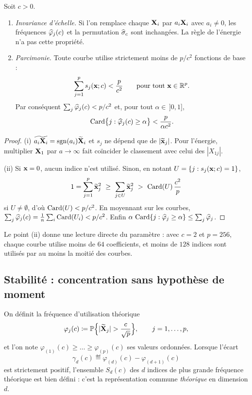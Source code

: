 \begin{proposition}\label{prop-proprietes-usage}
Soit $c>0$.
\begin{enumerate}[label=(\roman*)]
  \item \emph{Invariance d'échelle.} Si l'on remplace chaque $\mathbf{X}_i$ par $a_i\mathbf{X}_i$ avec $a_i\neq0$, les fréquences $\widehat{\varphi}_j(c)$ et la permutation $\widehat{\sigma}_c$ sont inchangées. La règle de l'énergie n'a pas cette propriété.
  \item \emph{Parcimonie.} Toute courbe utilise strictement moins de $p/c^2$ fonctions de base :
  \[
    \sum_{j=1}^ps_j(\mathbf{x};c)<\frac{p}{c^2}\qquad\text{pour tout }\mathbf{x}\in\mathbb{R}^p .
  \]
  Par conséquent $\sum_j\widehat{\varphi}_j(c)<p/c^2$ et, pour tout $\alpha\in\,]0,1]$,
  \[
    \operatorname{Card}\bigl\{j:\widehat{\varphi}_j(c)\ge\alpha\bigr\}<\frac{p}{\alpha c^2}.
  \]
\end{enumerate}
\end{proposition}

\begin{proof}
(i) $\widetilde{a_i\mathbf{X}_i}=\operatorname{sgn}(a_i)\widetilde{\mathbf{X}}_i$ et $s_j$ ne dépend que de $|\widetilde{\mathbf{x}}_j|$. Pour l'énergie, multiplier $\mathbf{X}_1$ par $a\to\infty$ fait coïncider le classement avec celui des $|X_{1j}|$.

(ii) Si $\mathbf{x}=0$, aucun indice n'est utilisé. Sinon, en notant $U=\{j:s_j(\mathbf{x};c)=1\}$,
\[
  1=\sum_{j=1}^p\tx_j^2\ \ge\ \sum_{j\in U}\tx_j^2\ >\ \Card(U)\,\frac{c^2}{p}
\]
si $U\neq\emptyset$, d'où $\operatorname{Card}(U)<p/c^2$. En moyennant sur les courbes, $\sum_j\widehat{\varphi}_j(c)=\frac1n\sum_i\operatorname{Card}(U_i)<p/c^2$. Enfin $\alpha\,\operatorname{Card}\{j:\widehat{\varphi}_j\ge\alpha\}\le\sum_j\widehat{\varphi}_j$.
\end{proof}

Le point (ii) donne une lecture directe du paramètre : avec $c=2$ et $p=256$, chaque courbe utilise moins de $64$ coefficients, et moins de $128$ indices sont utilisés par au moins la moitié des courbes.

\subsection{Stabilité : concentration sans hypothèse de moment}

On définit la fréquence d'utilisation théorique
\[
  \varphi_j(c)\eqdef\PP\Bigl\{|\tX_j|>\frac{c}{\sqrt p}\Bigr\},\qquad j=1,\dots,p,
\]
et l'on note $\varphi_{(1)}(c)\ge\dots\ge\varphi_{(p)}(c)$ ses valeurs ordonnées. Lorsque l'écart
\[
  \gamma_d(c)\eqdef\varphi_{(d)}(c)-\varphi_{(d+1)}(c)
\]
est strictement positif, l'ensemble $S_d(c)$ des $d$ indices de plus grande fréquence théorique est bien défini : c'est la représentation commune \emph{théorique} en dimension $d$.

